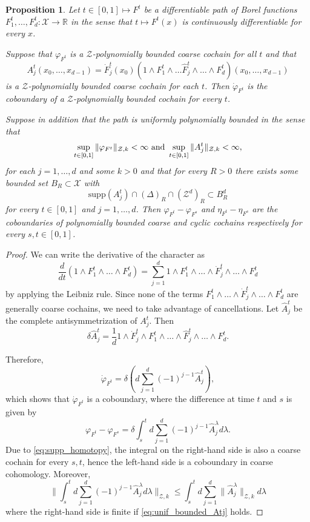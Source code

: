 \documentclass[12pt]{amsart}
\newtheorem{proposition}[theorem]{Proposition}
\newcommand{\RM}{{\mathbb R}}
\newcommand{\Xx}{{\mathcal X}}
\newcommand{\Zz}{{\mathcal Z}}
\begin{document}
\begin{proposition}\label{prop:cocycle_homotopy}
Let $t \in [0,1] \mapsto F^t$ be a differentiable path of Borel functions $F_1^t,\dots, F_d^t: \Xx\to \RM$ in the sense that $t \mapsto F^t(x)$ is continuously differentiable for every $x$.

Suppose that $\varphi_{F^t}$ is a $\Zz$-polynomially bounded coarse cochain for all $t$ and that 
$$A^t_j(x_0,\dots,x_{d-1}) = \dot{F}^t_j(x_0) (1\wedge F^t_1 \wedge \dots \widehat{F}^t_j \wedge \dots \wedge F^t_d)(x_0,\dots,x_{d-1})$$
is a $\Zz$-polynomially bounded coarse cochain for each $t$. Then $\dot{\varphi}_{F^t}$
is the coboundary of a $\Zz$-polynomially bounded cochain for every $t$.


Suppose in addition that the path is uniformly polynomially bounded in the sense that
\begin{equation}
\label{eq:unif_bounded_Atj}
\sup_{t\in [0,1]}\|\varphi_{F^t}\|_{\Zz, k} < \infty \hbox{ and } \sup_{t\in [0,1]} \|A^t_j\|_{\Zz, k} <\infty, 
\end{equation}
for each $j=1,\dots,d$ and some $k>0$ and that for every $R>0$ there exists some bounded set $B_R\subset \Xx$ with
\begin{equation}
\label{eq:supp_homotopy}
\mathrm{supp}(A_j^t)\cap (\Delta)_R \cap (\Zz^{d})_R \subset B_R^{d}
\end{equation}
for every $t\in [0,1]$ and $j=1,\dots,d$.
Then $\varphi_{F^t}-\varphi_{F^s}$ and $\eta_{F^t} - \eta_{F^s}$ are the coboundaries of polynomially bounded coarse and cyclic cochains respectively for every $s,t\in [0,1]$.
\end{proposition}
\begin{proof}
We can write the derivative of the character as
$$\frac{d}{dt}(1 \wedge F^t_1 \wedge \dots \wedge F^t_d)=\sum_{j=1}^d 1 \wedge F^t_1 \wedge \dots \wedge \dot{F}^t_j \wedge \dots \wedge F^t_d$$
by applying the Leibniz rule. Since none of the terms
$F^t_1 \wedge \dots \wedge \dot{F}^t_j \wedge \dots \wedge F^t_d$
are generally coarse cochains, we need to take advantage of cancellations.
Let $\hat{A}^t_j$ be the complete antisymmetrization of $A^t_j$.
Then
$$\delta \hat{A}^t_j= \frac{1}{d} 1\wedge \dot{F}^t_j \wedge F^t_1 \wedge \dots \wedge \widehat{F}^t_j \wedge \dots \wedge F^t_d.$$

Therefore,
$$\dot\varphi_{F^t} = \delta\left(d \sum_{j=1}^d (-1)^{j-1} \hat{A}_j^t\right),$$
which shows that $\dot\varphi_{F^t}$ is a coboundary, where the difference at time $t$ and $s$ is given by 
$$\varphi_{F^t}- \varphi_{F^s} = \delta \int_{s}^t d \sum_{j=1}^d (-1)^{j-1} \hat{A}^\lambda_j d\lambda.$$
Due to \eqref{eq:supp_homotopy}, the integral on the right-hand side is also a coarse cochain for every $s,t$, hence the left-hand side is a coboundary in coarse cohomology. Moreover, 
$$\bigg\lVert \int_{s}^t d \sum_{j=1}^d (-1)^{j-1} \hat{A}^\lambda_j d\lambda \bigg\rVert_{\Zz,k}\leq  \int_{s}^t d \sum_{j=1}^d \big\lVert\hat{A}^\lambda_j \big\rVert_{\Zz,k} d\lambda $$
where the right-hand side is finite if \eqref{eq:unif_bounded_Atj} holds.
\end{proof}
\end{document}
